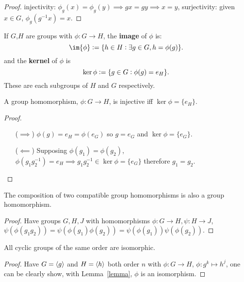 \documentclass[../Year1/Year1.tex]{subfiles}
\begin{document}
\begin{proof}
    injectivity: $\phi_g(x)=\phi_g(y)\implies gx=gy \implies x=y$, \qquad surjectivity: given $x\in G$, $\phi_g(g^{-1}x)=x$.
\end{proof}

\begin{definition}
    If $G$,$H$ are groups with $\phi:G\rightarrow H$, the \textbf{image} of $\phi$ is: \[
        \im{\phi} := \{h\in H:\exists g\in G, h = \phi(g)\}
    \textcolor{black}{.}
    \] and the \textbf{kernel} of $\phi$ is \[
        \ker{\phi} := \{g\in G: \phi(g)=e_H\}
    \textcolor{black}{.}
    \]
    These are each subgroups of $H$ and $G$ respectively.
\end{definition}

\begin{lemma}
    A group homomorphism, $\phi:G\rightarrow H$, is injective iff $\ker\phi=\{e_H\}$.
\end{lemma}

\begin{proof}
    \begin{itemize}
        \item[($\implies$)]$\phi(g)=e_H=\phi(e_G)$ so $g=e_G$ and $\ker\phi=\{e_G\}$.
        \item[($\impliedby$)] Supposing $\phi(g_1)=\phi(g_2)$, $\phi(g_1g_2^{-1})=e_H\implies g_1g_2^{-1}\in\ker\phi = \{e_G\}$ therefore $g_1=g_2$. \vspace{-15pt}
    \end{itemize}
\end{proof}

\begin{theorem}
    The composition of two compatible group homomorphisms is also a group homomorphism.
\end{theorem}

\begin{proof}
    Have groups $G,H,J$ with homomorphisms $\phi:G\rightarrow H, \psi:H\rightarrow J$, $\psi(\phi(g_1g_2))=\psi(\phi(g_1)\phi(g_2))=\psi(\phi(g_1))\psi(\phi(g_2))$.
\end{proof}

\begin{theorem}
    All cyclic groups of the same order are isomorphic.
\end{theorem}

\begin{proof}
    Have $G=\left\langle g \right\rangle$ and $H=\left\langle h \right\rangle$ both order $n$ with $\phi:G\rightarrow H$, $\phi:g^k\mapsto h^j$, one can be clearly show, with Lemma~\ref{lemma}, $\phi$ is an isomorphism.
\end{proof}
\end{document}
